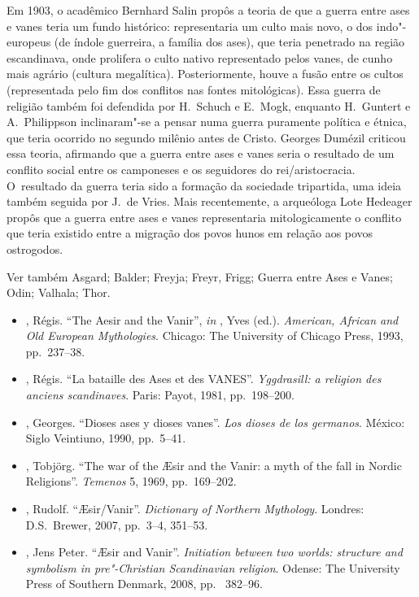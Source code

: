 Em 1903, o acadêmico Bernhard Salin propôs a teoria de que a guerra
entre ases e vanes teria um fundo histórico: representaria um culto mais
novo, o dos indo"-europeus (de índole guerreira, a família dos ases), que
teria penetrado na região escandinava, onde prolifera o culto nativo
representado pelos vanes, de cunho mais agrário (cultura megalítica).
Posteriormente, houve a fusão entre os cultos (representada pelo fim dos
conflitos nas fontes mitológicas). Essa guerra de religião também foi
defendida por H.~Schuch e E.~Mogk, enquanto H.~Guntert e A.~Philippson
inclinaram"-se a pensar numa guerra puramente política e étnica, que
teria ocorrido no segundo milênio antes de Cristo. Georges Dumézil
criticou essa teoria, afirmando que a guerra entre ases e vanes seria o
resultado de um conflito social entre os camponeses e os seguidores do
rei/aristocracia. O~resultado da guerra teria sido a formação da
sociedade tripartida, uma ideia também seguida por J.~de Vries. Mais
recentemente, a arqueóloga Lote Hedeager propôs que a guerra entre ases
e vanes representaria mitologicamente o conflito que teria existido
entre a migração dos povos hunos em relação aos povos ostrogodos.

Ver também Asgard; Balder; Freyja; Freyr, Frigg; Guerra entre Ases e
Vanes; Odin; Valhala; Thor.



\begin{itemize}\footnotesize
\item
  , Régis. ``The Aesir and the Vanir'', \emph{in}  , Yves (ed.).
  \emph{American, African and Old European Mythologies}. Chicago: The
  University of Chicago Press, 1993, pp.~237--38.
\item
  , Régis. ``La bataille des Ases et des VANES''. \emph{Yggdrasill: a
  religion des anciens scandinaves}. Paris: Payot, 1981, pp.~198--200.
\item
  , Georges. ``Dioses ases y dioses vanes''. \emph{Los dioses de los
  germanos}. México: Siglo Veintiuno, 1990, pp.~5--41.
\item
  , Tobjörg. ``The war of the Æsir and the Vanir: a myth of the
  fall in Nordic Religions''. \emph{Temenos} 5, 1969, pp.~169--202.
\item
  , Rudolf. ``Æsir/Vanir''. \emph{Dictionary of Northern Mythology}.
  Londres: D.S.~Brewer, 2007, pp.~3--4, 351--53.
\item
  , Jens Peter. ``Æsir and Vanir''. \emph{Initiation between two
  worlds: structure and symbolism in pre"-Christian Scandinavian
  religion}. Odense: The University Press of Southern Denmark, 2008, pp.~ 382--96.
\end{itemize}

